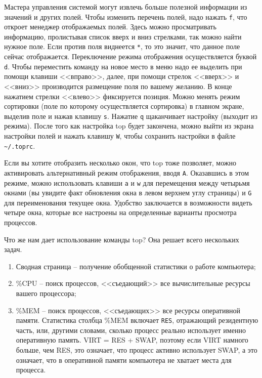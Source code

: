 \documentclass[12pt]{article}
\providecommand{\tightlist}{%
  \setlength{\itemsep}{0pt}\setlength{\parskip}{0pt}}
\begin{document}
Мастера управления системой могут извлечь больше полезной информации из
значений и других полей. Чтобы изменить перечень полей, надо нажать
\texttt{f}, что откроет менеджер отображаемых полей. Здесь можно
просматривать информацию, пролистывая список вверх и вниз стрелками, так
можно найти нужное поле. Если против поля виднеется \texttt{*}, то это
значит, что данное поле сейчас отображается. Переключение режима
отображения осуществляется буквой \texttt{d}. Чтобы переместить команду
на новое место в меню надо ее выделить при помощи клавиши <<вправо>>,
далее, при помощи стрелок <<вверх>> и <<вниз>> производится размещение поля
по вашему желанию. В конце нажатием стрелки <<влево>> фиксируется позиция.
Можно менять режим сортировки (поле по которому осуществляется
сортировка) в главном экране, выделив поле и нажав клавишу \texttt{s}.
Нажатие \texttt{q} щаканчивает настройку (выходит из режима). После того как настройка top
будет закончена, можно выйти из экрана настройки полей и нажать клавишу
\texttt{W}, чтобы сохранить настройки в файле
\texttt{\textasciitilde{}/.toprc}.

Если вы хотите отобразить несколько окон, что top тоже позволяет, можно
активировать альтернативный режим отображения, вводя \texttt{A}.
Оказавшись в этом режиме, можно использовать клавиши \texttt{a} и
\texttt{w} для перемещения между четырьмя окнами (вы увидите факт
обновления окна в левом верхнем углу страницы) и \texttt{G} для
переименования текущее окна. Удобство заключается в возможности видеть
четыре окна, которые все настроены на определенные варианты просмотра
процессов.

Что же нам дает использование команды top? Она решает всего нескольких
задач.
\begin{enumerate}
\tightlist
\item
  Сводная страница -- получение обобщенной статистики о работе компьютера;
\item
  \%CPU -- поиск процессов, <<съедающий>> все вычислительные ресурсы вашего
  процессора;
\item
  \%MEM -- поиск процессов, <<съедающих>> все ресурсы оперативной памяти.
  Статистика столбца \%MEM включает \texttt{RES}, отражающий резидентную
  часть, или, другими словами, сколько процесс реально использует
  именно оперативную память. VIRT = RES + SWAP, поэтому если VIRT
  намного больше, чем RES, это означает, что процесс активно использует
  SWAP, а это означает, что в оперативной памяти компьютера не хватает
  места для процесса.
\end{enumerate}
\end{document}
